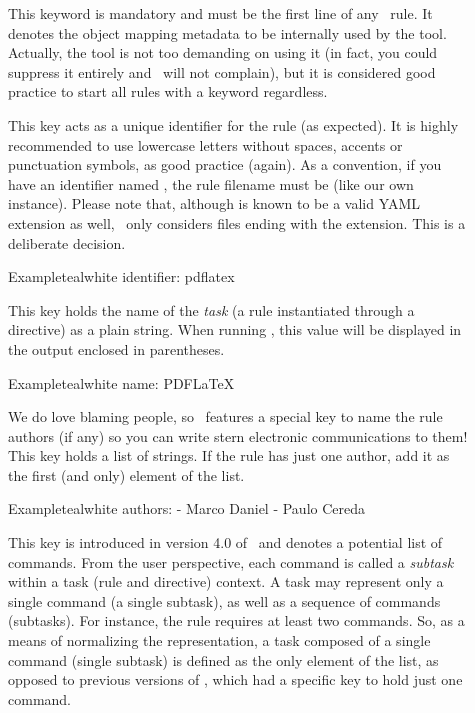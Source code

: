\begin{description}
\item[] This keyword is mandatory and must be the first line of any \arara\ rule. It denotes the object mapping metadata to be internally used by the tool. Actually, the tool is not too demanding on using it (in fact, you could suppress it entirely and \arara\ will not complain), but it is considered good practice to start all rules with a  keyword regardless.

\item[] This key acts as a unique identifier for the rule (as expected). It is highly recommended to use lowercase letters without spaces, accents or punctuation symbols, as good practice (again). As a convention, if you have an identifier named , the rule filename must be  (like our own instance). Please note that, although  is known to be a valid \gls{YAML} extension as well, \arara\ only considers files ending with the  extension. This is a deliberate decision.

\begin{codebox}{Example}{teal}{\icnote}{white}
identifier: pdflatex
\end{codebox}

\item[] This key holds the name of the \emph{task} (a rule instantiated through a directive) as a plain string. When running \arara, this value will be displayed in the output enclosed in parentheses.

\begin{codebox}{Example}{teal}{\icnote}{white}
name: PDFLaTeX
\end{codebox}

\item[] We do love blaming people, so \arara\ features a special key to name the rule authors (if any) so you can write stern electronic communications to them! This key holds a list of strings. If the rule has just one author, add it as the first (and only) element of the list.

\begin{codebox}{Example}{teal}{\icnote}{white}
authors:
- Marco Daniel
- Paulo Cereda
\end{codebox}

\item[] This key is introduced in version 4.0 of \arara\ and denotes a potential list of commands. From the user perspective, each command is called a \emph{subtask} within a task (rule and directive) context. A task may represent only a single command (a single subtask), as well as a sequence of commands (subtasks). For instance, the  rule requires at least two commands. So, as a means of normalizing the representation, a task composed of a single command (single subtask) is defined as the only element of the list, as opposed to previous versions of \arara, which had a specific key to hold just one command.


\end{description}

